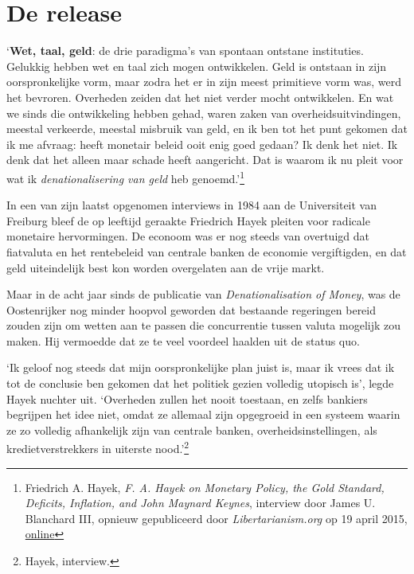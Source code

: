 \documentclass[
  a5paper,
  smalldemyvopaper,11pt,twoside,onecolumn,openright,extrafontsizes,
hidelinks]{memoir}
\renewenvironment{quote}%
               {\list{}{\rightmargin=.3cm\leftmargin=.3cm}%
                \itshape \item[]}%
               {\endlist}
\begin{document}
\chapter{De release}\label{de-release}

\begin{quote}
`\textbf{Wet, taal, geld}: de drie paradigma's van spontaan ontstane
instituties. Gelukkig hebben wet en taal zich mogen ontwikkelen. Geld is
ontstaan in zijn oorspronkelijke vorm, maar zodra het er in zijn meest
primitieve vorm was, werd het bevroren. Overheden zeiden dat het niet
verder mocht ontwikkelen. En wat we sinds die ontwikkeling hebben gehad,
waren zaken van overheidsuitvindingen, meestal verkeerde, meestal
misbruik van geld, en ik ben tot het punt gekomen dat ik me afvraag:
heeft monetair beleid ooit enig goed gedaan? Ik denk het niet. Ik denk
dat het alleen maar schade heeft aangericht. Dat is waarom ik nu pleit
voor wat ik \emph{denationalisering van geld} heb genoemd.'\footnote{Friedrich
  A. Hayek, \emph{F. A. Hayek on Monetary Policy, the Gold Standard,
  Deficits, Inflation, and John Maynard Keynes}, interview door James U.
  Blanchard III, opnieuw gepubliceerd door \emph{Libertarianism.org} op
  19 april 2015,
  \href{https://www.youtube.com/watch?v=EYhEDxFwFRU}{online}}
\end{quote}

In een van zijn laatst opgenomen interviews in 1984 aan de Universiteit
van Freiburg bleef de op leeftijd geraakte Friedrich Hayek pleiten voor
radicale monetaire hervormingen. De econoom was er nog steeds van
overtuigd dat fiatvaluta en het rentebeleid van centrale banken de
economie vergiftigden, en dat geld uiteindelijk best kon worden
overgelaten aan de vrije markt.

Maar in de acht jaar sinds de publicatie van \emph{Denationalisation of
Money}, was de Oostenrijker nog minder hoopvol geworden dat bestaande
regeringen bereid zouden zijn om wetten aan te passen die concurrentie
tussen valuta mogelijk zou maken. Hij vermoedde dat ze te veel voordeel
haalden uit de status quo.

`Ik geloof nog steeds dat mijn oorspronkelijke plan juist is, maar ik
vrees dat ik tot de conclusie ben gekomen dat het politiek gezien
volledig utopisch is', legde Hayek nuchter uit. `Overheden zullen het
nooit toestaan, en zelfs bankiers begrijpen het idee niet, omdat ze
allemaal zijn opgegroeid in een systeem waarin ze zo volledig
afhankelijk zijn van centrale banken, overheidsinstellingen, als
kredietverstrekkers in uiterste nood.'\footnote{Hayek, interview.}
\end{document}
